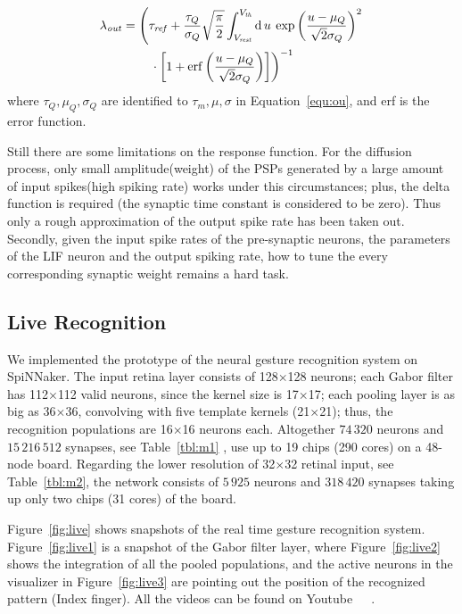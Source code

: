\documentclass[journal]{journal}
\def\D{\mathrm{d}}
\begin{document}
\begin{align}
\lambda_\mathit{out} &=\left(\tau_\mathit{ref} + \frac{\tau_Q}{\sigma_Q}\sqrt{\frac{\pi}{2}} \int_{V_\mathit{rest}}^{V_\mathit{th}}\D\,u \:\exp \left(\frac{u-\mu_Q}{\sqrt2\sigma_Q} \right )^{2} \right. \nonumber \\
&\qquad \left. \vphantom{\int_t} \cdot  \left[1+\mathrm{erf} \left(\frac{u-\mu_Q}{\sqrt2\sigma_Q} \right ) \right ]\right)^{-1}
\label{equ:sgt}
\end{align}
where $\tau_Q, \mu_Q, \sigma_Q$ are identified to $\tau_m, \mu, \sigma$ in Equation~\ref{equ:ou}, and erf is the error function.

Still there are some limitations on the response function. 
For the diffusion process, only small amplitude(weight) of the PSPs generated by a large amount of input spikes(high spiking rate) works under this circumstances; 
plus, the delta function is required (the synaptic time constant is considered to be zero). Thus only a rough approximation of the output spike rate has been taken out.
Secondly, given the input spike rates of the pre-synaptic neurons, the parameters of the LIF neuron and the output spiking rate, how to tune the every corresponding synaptic weight remains a hard task.


\subsection{Live Recognition}
We implemented the prototype of the neural gesture recognition system on SpiNNaker. 
The input retina layer consists of 128$\times$128 neurons; 
each Gabor filter has 112$\times$112 valid neurons, since the kernel size is 17$\times$17; 
each pooling layer is as big as 36$\times$36, convolving with five template kernels (21$\times$21); 
thus, the recognition populations are 16$\times$16 neurons each. Altogether $74\,320$ neurons and $15\,216\,512$ synapses, see Table~\ref{tbl:m1} , use up to 19 chips (290 cores) on a 48-node board. Regarding the lower resolution of 32$\times$32 retinal input, see Table~\ref{tbl:m2}, the network consists of $5\,925$ neurons and $318\,420$ synapses taking up only two chips (31 cores) of the board.

Figure~\ref{fig:live} shows snapshots of the real time gesture recognition system. 
Figure~\ref{fig:live1} is a snapshot of the Gabor filter layer, where Figure~\ref{fig:live2} shows the integration of all the pooled populations, and the active neurons in the visualizer in Figure~\ref{fig:live3} are pointing out the position of the recognized pattern (Index finger). 
All the videos can be found on Youtube~\cite{video1}~\cite{video2}~\cite{video3}. %
\end{document}
